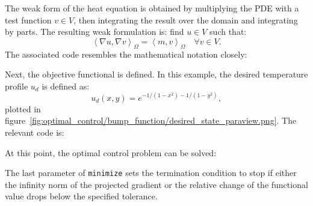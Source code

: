 \documentclass[prodmode,acmtoms]{acmsmall}
\begin{document}

The weak form of the heat equation is obtained by multiplying the PDE with a test function $v \in V$, then integrating the result over the domain and integrating by parts.
The resulting weak formulation is: find $u \in V$ such that: 
\begin{equation*}
\left<\nabla u, \nabla v\right>_\Omega = \left<m, v\right>_\Omega \quad \forall v \in V. 
\end{equation*}
The associated code resembles the mathematical notation closely:


Next, the objective functional is defined. 
In this example, the desired temperature profile $u_d$ is defined as:
\begin{equation*}
    u_d(x, y) = e^{-1/(1-x^2) - 1/(1-y^2)}, 
\end{equation*}
plotted in figure~\ref{fig:optimal_control/bump_function/desired_state_paraview.png}. 
The relevant code is:


At this point, the optimal control problem can be solved: 


The last parameter of \texttt{minimize} sets the termination condition 
to stop if either the infinity norm of the projected gradient or the relative change of the functional value 
drops below the specified tolerance.
\end{document}
